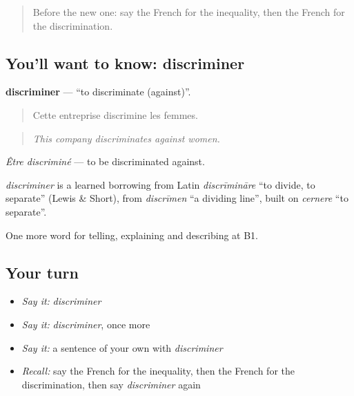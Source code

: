 \label{lesson:FR-C365-discriminer}



\begin{quote}
Before the new one: say the French for the inequality, then the French for the discrimination.
\end{quote}

\subsection*{You'll want to know: discriminer}
\textbf{discriminer} — \textquotedblleft{}to discriminate (against)\textquotedblright{}.

\begin{quote}
Cette entreprise discrimine les femmes.
\end{quote}

\begin{quote}
\emph{This company discriminates against women.}
\end{quote}

\emph{Être discriminé} — to be discriminated against.

\begin{cousinweb}
\emph{discriminer} is a learned borrowing from Latin \emph{discrīmināre} \textquotedblleft{}to divide, to separate\textquotedblright{} (Lewis \& Short), from \emph{discrīmen} \textquotedblleft{}a dividing line\textquotedblright{}, built on \emph{cernere} \textquotedblleft{}to separate\textquotedblright{}.
\end{cousinweb}

\begin{grammarlens}[title={What you've built}]
One more word for telling, explaining and describing at B1.
\end{grammarlens}

\subsection*{Your turn}
\begin{itemize}
\raggedright
  \item \emph{Say it:} \emph{discriminer}
  \item \emph{Say it:} \emph{discriminer}, once more
  \item \emph{Say it:} a sentence of your own with \emph{discriminer}
  \item \emph{Recall:} say the French for the inequality, then the French for the discrimination, then say \emph{discriminer} again
\end{itemize}

